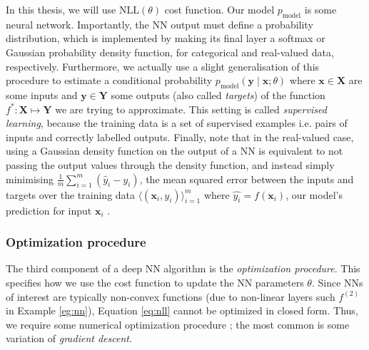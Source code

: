 \documentclass[11pt, a4paper, bibliography=totoc]{report}
\newcommand{\x}{\mathbf{x}}
\newcommand{\y}{\mathbf{y}}
\begin{document}
In this thesis, we will use $ \text{NLL}(\theta) $ cost function. Our model $ p_{\text{model}} $ is some neural network. Importantly, the NN output must define a probability distribution, which is implemented by making its final layer a softmax or Gaussian probability density function, for categorical and real-valued data, respectively. Furthermore, we actually use a slight generalisation of this procedure to estimate a conditional probability  $ p_{\text{model}}(\y \mid \x; \theta ) $ where $ \x \in \mathbf{X} $ are some inputs and $ \y \in \mathbf{Y} $ some outputs (also called \textit{targets}) of the function $ f^* : \textbf{X} \mapsto \textbf{Y} $ we are trying to approximate. This setting is called \textit{supervised learning}, because the training data is a set of supervised examples i.e. pairs of inputs and correctly labelled outputs. Finally, note that in the real-valued case, using a Gaussian density function on the output of a NN is equivalent to not passing the output values through the density function, and instead simply minimising $ \frac{1}{m} \sum_{i=1}^{m} ( \hat{y}_i - y_i ) $, the mean squared error between the inputs and targets  over the training data $ \langle (\x_i, y_i) \rangle_{i=1}^m $ where $ \hat{y_i} = f(\x_i) $, our model's prediction for input $ \x_i $ \cite[p.~132]{Goodfellow-et-al-2016}.



\subsubsection{Optimization procedure}
The third component of a deep NN algorithm is the \textit{optimization procedure}. This specifies how we use the cost function to update the NN parameters $ \theta $. Since NNs of interest are typically non-convex functions (due to non-linear layers such $ f^{(2)} $ in Example \ref{eg:nn}), Equation \ref{eq:nll} cannot be optimized in closed form. Thus, we require some numerical optimization procedure \cite[p.~151]{Goodfellow-et-al-2016}; the most common is some variation of \textit{gradient descent}.
\end{document}
